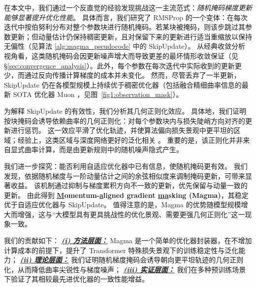 \documentclass[11pt, a4paper, twocolumn, copyright, goog]{google}
\theoremstyle{plain}
\theoremstyle{definition}
\theoremstyle{remark}
\begin{document}
在本文中，我们通过一个反直觉的经验发现挑战这一主流范式：\emph{随机掩码梯度更新能够显著提升优化性能}。
具体而言，我们研究了 RMSProp \citep{hinton2012rmsprop} 的一个变体：在每次迭代中按伯努利分布对整个参数块进行随机掩码。若某块被掩码，则该步跳过其参数更新；但动量估计仍保持稠密更新，且对保留下来的更新进行适当重缩放以保持无偏性（见算法 \ref{alg:magma_pseudocode} 中的 SkipUpdate）。
从经典收敛分析视角看，这类随机掩码会因更新噪声增大而导致更差的最坏情形收敛保证（见 \S \ref{sec:convergence_analysis}）。此外，每个参数在每次迭代中实际收到的更新更少，而通过反向传播计算梯度的成本并未变化。
然而，尽管丢弃了一半更新，SkipUpdate 仍在各模型规模上持续优于稠密优化器（包括融合精细曲率信息的最新 SOTA 优化器 Muon \citep{jordan2024muon}，见图~\ref{fig1:observation_mask}）。




为解释 SkipUpdate 的有效性，我们分析其几何正则化效应。
具体地，我们证明按块掩码会诱导依赖曲率的几何正则化：对每个参数块内与损失陡峭方向对齐的更新进行惩罚。
这一效应平滑了优化轨迹，并使算法偏向损失景观中更平坦的区域；经验上，这类区域与深度网络更好的泛化相关 \citep{hochreiter1997flat,keskar2016large,jastrzkebski2017three}。
重要的是，该正则化并非来自显式曲率计算，而是由更新规则中的随机噪声隐式产生。


我们进一步探究：能否利用自适应优化器中已有信息，使随机掩码更有效。
我们发现，依据随机梯度与一阶动量估计之间的余弦相似度来调制掩码更新，可带来显著收益。
该机制通过抑制与梯度累积方向不一致的更新，优先保留与动量一致的更新。
由此得到 \textbf{\underline{M}omentum-\underline{a}ligned \underline{g}radient \underline{ma}sking (Magma)}，其稳定优于自适应优化器与 SkipUpdate。
值得注意的是，Magma 的优势随模型规模增大而增强，这与“大模型具有更具挑战性的优化景观、需要更强几何正则化”这一现象一致。


我们的贡献如下：
\underline{\textbf{\textit{(i) 方法层面：}}} Magma 是一个简单的优化器封装器，在不增加计算成本的前提下，提升了 Transformer 特殊损失景观下的训练稳定性与泛化能力；
\underline{\textit{\textbf{(ii) 理论层面：}}} 我们证明随机梯度掩码会诱导朝向更平坦轨迹的几何正则化，从而降低曲率尖锐性与梯度噪声；
\underline{\textbf{\textit{(iii) 实证层面：}}} 我们在多种预训练场景下验证了其相较最先进优化器的一致性能增益。



\end{document}
